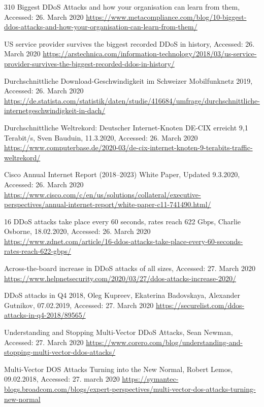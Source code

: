 \begin{thebibliography}{99}
 310 Biggest DDoS Attacks and how your organisation can learn from them, Accessed: 26. March 2020 \url{https://www.metacompliance.com/blog/10-biggest-ddos-attacks-and-how-your-organisation-can-learn-from-them/}

 US service provider survives the biggest recorded DDoS in history, Accessed: 26. March 2020 \url{https://arstechnica.com/information-technology/2018/03/us-service-provider-survives-the-biggest-recorded-ddos-in-history/}

Durchschnittliche Download-Geschwindigkeit im Schweizer Mobilfunknetz 2019, Accessed: 26. March 2020 \url{https://de.statista.com/statistik/daten/studie/416684/umfrage/durchschnittliche-internetgeschwindigkeit-in-dach/}

Durchschnittliche Weltrekord: Deutscher Internet-Knoten DE-CIX erreicht 9,1 Terabit/s, Sven Bauduin, 11.3.2020, Accessed: 26. March 2020 \url{https://www.computerbase.de/2020-03/de-cix-internet-knoten-9-terabits-traffic-weltrekord/}

Cisco Annual Internet Report (2018–2023) White Paper, Updated 9.3.2020, Accessed: 26. March 2020 \url{https://www.cisco.com/c/en/us/solutions/collateral/executive-perspectives/annual-internet-report/white-paper-c11-741490.html/}

16 DDoS attacks take place every 60 seconds, rates reach 622 Gbps, Charlie Osborne, 18.02.2020, Accessed: 26. March 2020 \url{https://www.zdnet.com/article/16-ddos-attacks-take-place-every-60-seconds-rates-reach-622-gbps/}

Across-the-board increase in DDoS attacks of all sizes, Accessed: 27. March 2020 \url{https://www.helpnetsecurity.com/2020/03/27/ddos-attacks-increase-2020/}

DDoS attacks in Q4 2018, Oleg Kupreev, Ekaterina Badovskaya, Alexander Gutnikov, 07.02.2019, Accessed: 27. March 2020 \url{https://securelist.com/ddos-attacks-in-q4-2018/89565/}

Understanding and Stopping Multi-Vector DDoS Attacks, Sean Newman, Accessed: 27. March 2020 \url{https://www.corero.com/blog/understanding-and-stopping-multi-vector-ddos-attacks/}

Multi-Vector DOS Attacks Turning into the New Normal, Robert Lemos, 09.02.2018, Accessed: 27. march 2020 \url{https://symantec-blogs.broadcom.com/blogs/expert-perspectives/multi-vector-dos-attacks-turning-new-normal}


\end{thebibliography}
